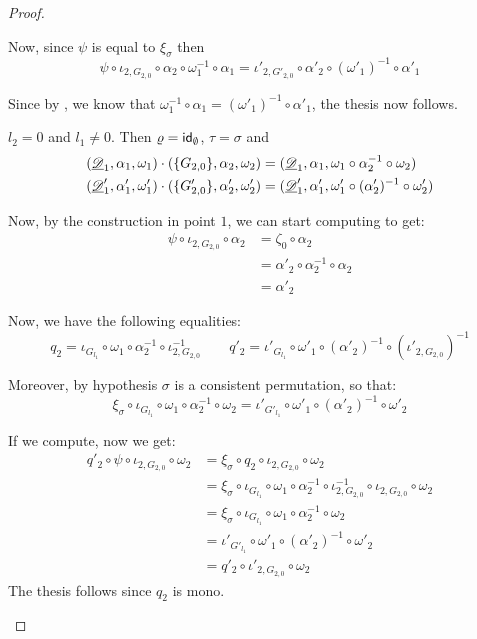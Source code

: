 \begin{proof}
\begin{enumerate}
		Now, since $\psi$ is equal to $\xi_\sigma$ then 
		\[\psi \circ \iota_{2, G_{2,0}} \circ \alpha_2\circ \omega^{-1}_1\circ \alpha_1=\iota'_{2, G'_{2,0}}\circ  \alpha'_2\circ (\omega'_1)^{-1}\circ \alpha'_1 \]
		
		Since by , we know that $ \omega^{-1}_1\circ \alpha_1= (\omega'_1)^{-1}\circ \alpha'_1$, the thesis now follows.
	

		\smallskip \noindent $l_2=0$ and $l_1\neq0$. Then $\varrho=\mathsf{id}_{\emptyset}$, $\tau = \sigma$ and 
		\begin{align*}(\underline{\mathscr{D}}_1, \alpha_1, \omega_1) \cdot (\{G_{2,0}\}, \alpha_2, \omega_2)
			&=(\underline{\mathscr{D}}_1, \alpha_1, \omega_1 \circ \alpha_2^{-1}\circ \omega_2)\\(\underline{\mathscr{D}}'_1, \alpha'_1, \omega'_1) \cdot (\{G'_{2,0}\}, \alpha'_2, \omega'_2)&=(\underline{\mathscr{D}}'_1, \alpha'_1, \omega'_1 \circ (\alpha'_2)^{-1}\circ \omega'_2)
		\end{align*}
	
	Now, by the construction in point $1$, we can start computing to get:
	\begin{align*}
		 \psi \circ \iota_{2, G_{2,0}}\circ \alpha_2&=\zeta_0\circ \alpha_2\\&=  \alpha'_2\circ \alpha^{-1}_2\circ \alpha_2 \\&=\alpha'_2
	\end{align*}
	
		Now,  we have the following equalities:
		\[q_2=\iota_{G_{l_1}}\circ  \omega_1  \circ \alpha^{-1}_2 \circ \iota^{-1}_{2,G_{2,0}} \qquad q'_2=\iota'_{G_{l_1}}\circ  \omega'_1  \circ (\alpha'_2)^{-1} \circ (\iota'_{2,G_{2,0}})^{-1}\]
	
	Moreover, by hypothesis $\sigma$ is a consistent permutation, so that:
		\[\xi_\sigma\circ \iota_{G_{l_1}}\circ \omega_1 \circ \alpha_2^{-1}\circ \omega_2=\iota'_{G'_{l_1}}\circ \omega'_1 \circ (\alpha'_2)^{-1}\circ \omega'_2\]
		
		If we compute, now we get:
		\begin{align*}
			q'_2\circ \psi \circ \iota_{2, G_{2,0}}\circ \omega_2 & = \xi_\sigma \circ q_2\circ \iota_{2, G_{2,0}}\circ \omega_2 \\&=\xi_\sigma \circ \iota_{G_{l_1}}\circ  \omega_1  \circ \alpha^{-1}_2 \circ \iota^{-1}_{2,G_{2,0}}\circ \iota_{2, G_{2,0}}\circ \omega_2\\&=\xi_\sigma \circ \iota_{G_{l_1}}\circ  \omega_1  \circ \alpha^{-1}_2 \circ \omega_2\\&=\iota'_{G'_{l_1}}\circ \omega'_1 \circ (\alpha'_2)^{-1}\circ \omega'_2\\&=q'_2\circ \iota'_{2, G_{2,0}}\circ \omega_2 
		\end{align*}
		The thesis follows since $q_2$ is mono.
		

\end{enumerate}
\end{proof}
